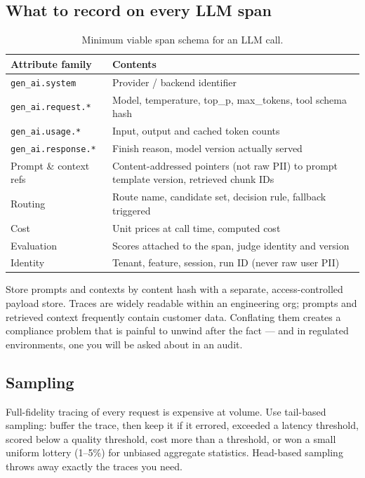 \documentclass[11pt,twoside,openright]{book}
\theoremstyle{definition}
\theoremstyle{plain}
\theoremstyle{remark}
\newcommand{\code}[1]{\texttt{\small #1}}
\begin{document}
\subsection{What to record on every LLM span}

\begin{table}[H]
\centering\footnotesize
\renewcommand{\arraystretch}{1.25}
\begin{tabularx}{\textwidth}{@{}l X@{}}
\toprule
\textbf{Attribute family} & \textbf{Contents} \\
\midrule
\code{gen\_ai.system} & Provider / backend identifier \\
\code{gen\_ai.request.*} & Model, temperature, top\_p, max\_tokens, tool schema hash \\
\code{gen\_ai.usage.*} & Input, output and cached token counts \\
\code{gen\_ai.response.*} & Finish reason, model version actually served \\
Prompt \& context refs & Content-addressed pointers (not raw PII) to prompt template version, retrieved chunk IDs \\
Routing & Route name, candidate set, decision rule, fallback triggered \\
Cost & Unit prices at call time, computed cost \\
Evaluation & Scores attached to the span, judge identity and version \\
Identity & Tenant, feature, session, run ID (never raw user PII) \\
\bottomrule
\end{tabularx}
\caption{Minimum viable span schema for an LLM call.}
\end{table}

\begin{practice}
Store prompts and contexts by content hash with a separate, access-controlled
payload store. Traces are widely readable within an engineering org; prompts and
retrieved context frequently contain customer data. Conflating them creates a
compliance problem that is painful to unwind after the fact --- and in regulated
environments, one you will be asked about in an audit.
\end{practice}

\subsection{Sampling}

Full-fidelity tracing of every request is expensive at volume. Use tail-based
sampling: buffer the trace, then keep it if it errored, exceeded a latency
threshold, scored below a quality threshold, cost more than a threshold, or won
a small uniform lottery (1--5\%) for unbiased aggregate statistics. Head-based
sampling throws away exactly the traces you need.
\end{document}
